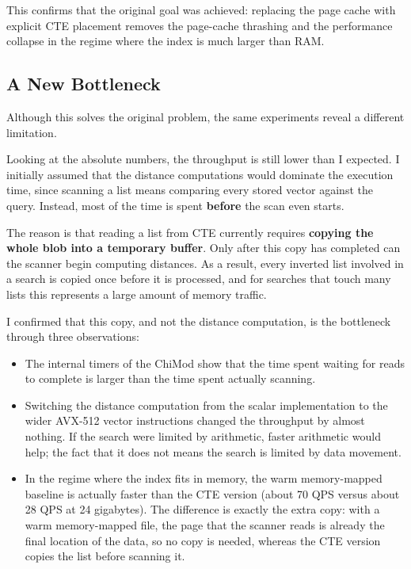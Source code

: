 \documentclass[11pt]{article}
\begin{document}
This confirms that the original goal was achieved: replacing the page
cache with explicit CTE placement removes the page-cache thrashing and
the performance collapse in the regime where the index is much larger
than RAM.

\subsection{A New Bottleneck}

Although this solves the original problem, the same experiments reveal
a different limitation.

Looking at the absolute numbers, the throughput is still lower than I
expected. I initially assumed that the distance computations would
dominate the execution time, since scanning a list means comparing
every stored vector against the query. Instead, most of the time is
spent \textbf{before} the scan even starts.

The reason is that reading a list from CTE currently requires
\textbf{copying the whole blob into a temporary buffer}. Only after
this copy has completed can the scanner begin computing distances. As
a result, every inverted list involved in a search is copied once
before it is processed, and for searches that touch many lists this
represents a large amount of memory traffic.

I confirmed that this copy, and not the distance computation, is the
bottleneck through three observations:

\begin{itemize}
\item The internal timers of the ChiMod show that the time spent
waiting for reads to complete is larger than the time spent actually
scanning.
\item Switching the distance computation from the scalar
implementation to the wider AVX-512 vector instructions changed the
throughput by almost nothing. If the search were limited by
arithmetic, faster arithmetic would help; the fact that it does not
means the search is limited by data movement.
\item In the regime where the index fits in memory, the warm
memory-mapped baseline is actually faster than the CTE version (about
70 QPS versus about 28 QPS at 24 gigabytes). The difference is exactly
the extra copy: with a warm memory-mapped file, the page that the
scanner reads is already the final location of the data, so no copy is
needed, whereas the CTE version copies the list before scanning it.
\end{itemize}
\end{document}

